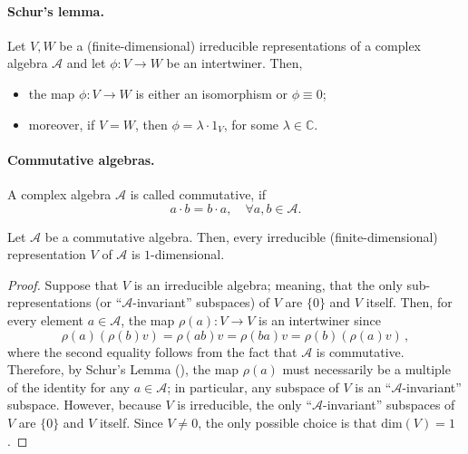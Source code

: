 \paragraph{Schur's lemma.}

\begin{lemma}\label{lem:schur}
Let $V,W$ be a (finite-dimensional) irreducible representations of a complex algebra $\mathcal{A}$ and let $\phi: V \rightarrow W$ be an intertwiner. Then, 
\begin{itemize}
    \item the map $\phi: V \rightarrow W$ is either an isomorphism or $\phi \equiv 0$;
    \item moreover, if $V=W$, then $\phi = \lambda \cdot 1_V$, for some $\lambda \in \mathbb{C}.
$
\end{itemize}
\end{lemma}


\paragraph{Commutative algebras.}

\begin{definition}
A complex algebra $\mathcal{A}$ is called commutative, if
$$
a \cdot b = b \cdot a, \quad \forall a,b \in \mathcal{A}.
$$
\end{definition}

\begin{lemma}
Let $\mathcal{A}$ be a commutative algebra. Then, every irreducible (finite-dimensional) representation $V$ of $\mathcal{A}$ is $1$-dimensional.
\end{lemma}
\begin{proof}
Suppose that $V$ is an irreducible algebra; meaning, that the only sub-representations (or ``$\mathcal{A}$-invariant'' subspaces) of $V$ are $\{0\}$ and $V$ itself. Then, for every element $a \in \mathcal{A}$, the map $\rho(a): V \rightarrow V$ is an intertwiner since
$$
\rho(a)(\rho(b) v) =  \rho(ab) v = \rho(ba) v = \rho(b)(\rho(a) v) \, ,
$$
where the second equality follows from the fact that $\mathcal{A}$ is commutative. Therefore, by Schur's Lemma (), the map $\rho(a)$ must necessarily be a multiple of the identity for any $a \in \mathcal{A}$; in particular, any subspace of $V$ is an ``$\mathcal{A}$-invariant'' subspace.  However, because $V$ is irreducible, the only ``$\mathcal{A}$-invariant'' subspaces of $V$ are $\{0\}$ and $V$ itself. Since $V \neq 0$, the only possible choice is that $\mathrm{dim}(V)=1$.
\end{proof}

